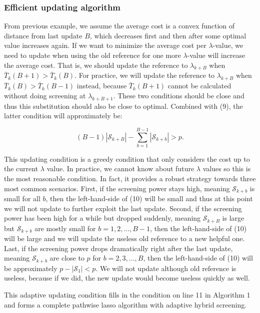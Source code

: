 \subsubsection{Efficient updating algorithm}

From previous example, we assume the average cost is a convex function of distance from last update $B$, which decreases first and then after some optimal value increases again. If we want to minimize the average cost per $\lambda$-value, we need to update when using the old reference for one more $\lambda$-value will increase the average cost. That is, we should update the reference to $\lambda_{k+B}$ when $\bar{T}_k(B+1)>\bar{T}_k(B)$. For practice, we will update the reference to $\lambda_{k+B}$ when $\bar{T}_k(B)>\bar{T}_k(B-1)$ instead, because $\bar{T}_k(B+1)$ cannot be calculated without doing screening at $\lambda_{k+B+1}$. These two conditions should be close and thus this substitution should also be close to optimal. Combined with (9), the latter condition will approximately be:

\begin{equation}
    (B-1)|\mathcal{S}_{k+B}|-\sum_{b=1}^{B-1}|\mathcal{S}_{k+b}|>p.
\end{equation}


This updating condition is a greedy condition that only considers the cost up to the current $\lambda$ value. In practice, we cannot know about future $\lambda$ values so this is the most reasonable condition. In fact, it provides a robust strategy towards three most common scenarios. First, if the screening power stays high, meaning $\mathcal{S}_{k+b}$ is small for all $b$, then the left-hand-side of (10) will be small and thus at this point we will not update to further exploit the last update. Second, if the screening power has been high for a while but dropped suddenly, meaning $\mathcal{S}_{k+B}$ is large but $\mathcal{S}_{k+b}$ are mostly small for $b=1,2,...,B-1$, then the left-hand-side of (10) will be large and we will update the useless old reference to a new helpful one. Last, if the screening power drops dramatically right after the last update, meaning $\mathcal{S}_{k+b}$ are close to $p$ for $b=2,3,...,B$, then the left-hand-side of (10) will be approximately $p-|\mathcal{S}_1|<p$. We will not update although old reference is useless, because if we did, the new update would become useless quickly as well.

This adaptive updating condition fills in the condition on line 11 in Algorithm 1 and forms a complete pathwise lasso algorithm with adaptive hybrid screening. 


